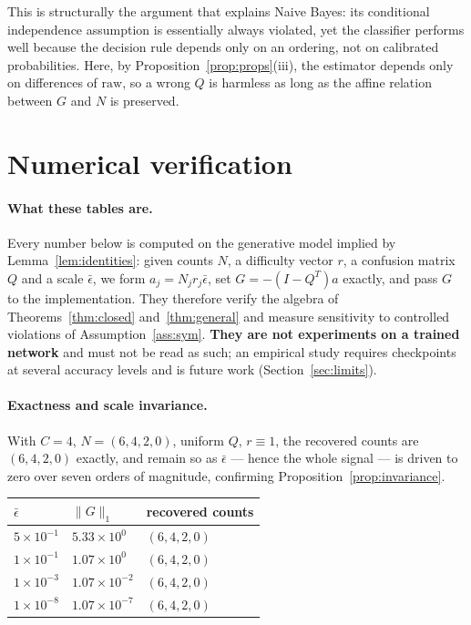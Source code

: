 \documentclass[11pt]{article}
\theoremstyle{remark}
\begin{document}
This is structurally the argument that explains Naive Bayes: its conditional
independence assumption is essentially always violated, yet the classifier
performs well because the decision rule depends only on an ordering, not on
calibrated probabilities. Here, by Proposition~\ref{prop:props}(iii), the
estimator depends only on differences of $\mathrm{raw}$, so a wrong $Q$ is
harmless as long as the affine relation between $G$ and $N$ is preserved.

\section{Numerical verification}
\label{sec:numerics}

\paragraph{What these tables are.} Every number below is computed on the
generative model implied by Lemma~\ref{lem:identities}: given counts $N$, a
difficulty vector $r$, a confusion matrix $Q$ and a scale $\bar\epsilon$, we
form $a_j = N_jr_j\bar\epsilon$, set $G = -(I-Q^T)a$ exactly, and pass $G$ to
the implementation. They therefore verify the algebra of
Theorems~\ref{thm:closed} and~\ref{thm:general} and measure sensitivity to
controlled violations of Assumption~\ref{ass:sym}. \textbf{They are not
experiments on a trained network} and must not be read as such; an empirical
study requires checkpoints at several accuracy levels and is future work
(Section~\ref{sec:limits}).

\paragraph{Exactness and scale invariance.}
With $C=4$, $N=(6,4,2,0)$, uniform $Q$, $r\equiv1$, the recovered counts are
$(6,4,2,0)$ exactly, and remain so as $\bar\epsilon$ --- hence the whole
signal --- is driven to zero over seven orders of magnitude, confirming
Proposition~\ref{prop:invariance}.

\begin{center}
\begin{tabular}{lll}
\toprule
$\bar\epsilon$ & $\|G\|_1$ & recovered counts \\
\midrule
$5\times10^{-1}$ & $5.33\times10^{0}$  & $(6,4,2,0)$ \\
$1\times10^{-1}$ & $1.07\times10^{0}$  & $(6,4,2,0)$ \\
$1\times10^{-3}$ & $1.07\times10^{-2}$ & $(6,4,2,0)$ \\
$1\times10^{-8}$ & $1.07\times10^{-7}$ & $(6,4,2,0)$ \\
\bottomrule
\end{tabular}
\end{center}
\end{document}
